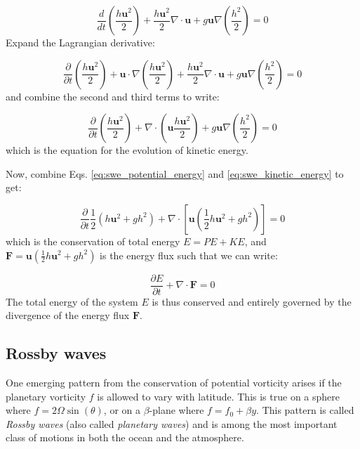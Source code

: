 \documentclass[12pt]{article}
\numberwithin{equation}{section}
\numberwithin{figure}{section}
\numberwithin{table}{section}
\begin{document}
\begin{equation}
  \frac{d}{dt} \left( \frac{h \mathbf{u}^2}{2} \right)
  + \frac{h\mathbf{u}^2}{2} \nabla \cdot \mathbf{u}
  + g\mathbf{u}\nabla \left(\frac{h^2}{2}\right)
  = 0
\end{equation}
Expand the Lagrangian derivative:

\begin{equation}
  \frac{\partial}{\partial t} \left( \frac{h \mathbf{u}^2}{2} \right)
  + \mathbf{u} \cdot \nabla \left( \frac{h \mathbf{u}^2}{2} \right)
  + \frac{h\mathbf{u}^2}{2} \nabla \cdot \mathbf{u}
  + g\mathbf{u}\nabla \left(\frac{h^2}{2}\right)
  = 0
\end{equation}
and combine the second and third terms to write:

\begin{equation}
  \frac{\partial}{\partial t} \left( \frac{h \mathbf{u}^2}{2} \right)
  + \nabla \cdot \left( \mathbf{u} \frac{h \mathbf{u}^2}{2} \right)
  + g\mathbf{u}\nabla \left(\frac{h^2}{2}\right)
  = 0
  \label{eq:swe_kinetic_energy}
\end{equation}
which is the equation for the evolution of kinetic energy.

Now, combine Eqs. \ref{eq:swe_potential_energy} and \ref{eq:swe_kinetic_energy} to get:

\begin{equation}
  \frac{\partial}{\partial t} \frac{1}{2} \left(h\mathbf{u}^2 + gh^2\right)
  + \nabla \cdot \left[ \mathbf{u} \left( \frac{1}{2} h\mathbf{u}^2 + gh^2\right) \right] = 0
\end{equation}
which is the conservation of total energy $E = PE + KE$, and
$\mathbf{F} = \mathbf{u} \left( \frac{1}{2} h\mathbf{u}^2 + gh^2\right)$ is the energy flux
such that we can write:

\begin{equation}
  \frac{\partial E}{\partial t} + \nabla \cdot \mathbf{F} = 0
\end{equation}
The total energy of the system $E$ is thus conserved and entirely governed by
the divergence of the energy flux $\mathbf{F}$.

\subsection{Rossby waves}

One emerging pattern from the conservation of potential vorticity arises if
the planetary vorticity $f$ is allowed to vary with latitude.
This is true on a sphere where $f = 2 \Omega \sin(\theta)$, or on a $\beta$-plane
where $f = f_0 + \beta y$.
This pattern is called \textit{Rossby waves} (also called
\textit{planetary waves}) and is among the most important
class of motions in both the ocean and the atmosphere.
\end{document}
